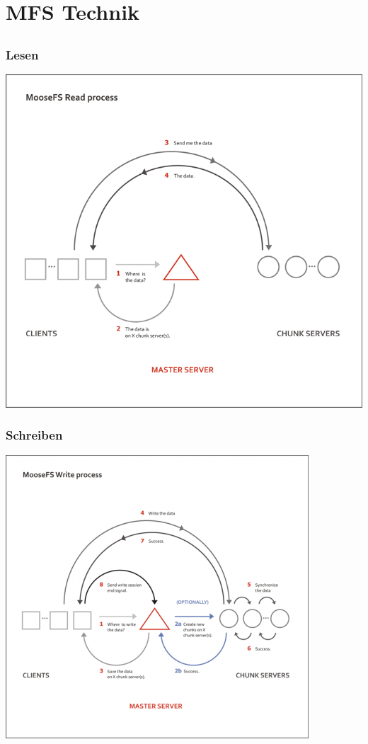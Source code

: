 \documentclass{beamer}
\begin{document}
\section{MFS Technik}
\subsection*{}
\begin{frame}
	\frametitle{Lesen}
	\centering
	\includegraphics[scale=0.3]{read.png}
\end{frame}

\begin{frame}
	\frametitle{Schreiben}
	\centering
	\includegraphics[scale=0.5]{write.png}
\end{frame}
\end{document}
